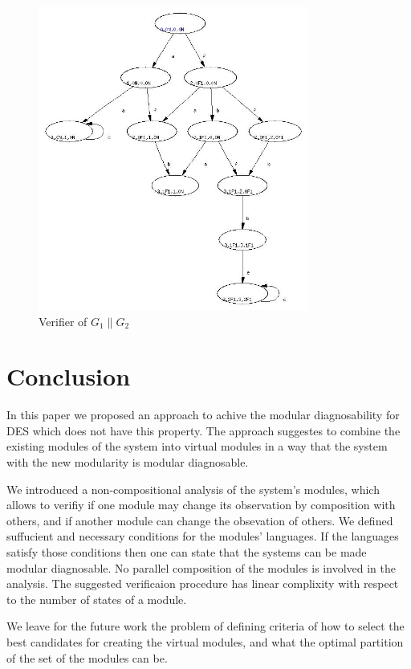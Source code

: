 \documentclass[a4paper, 10pt, conference]{ieeeconf}
\begin{document}
\begin{figure}[t]
\centering
\includegraphics[height=100mm]{verifier_G1G2.jpg}
\caption{Verifier of $G_1 \parallel G_2$}
\label{fig:verifier_G1G2}
\end{figure}


\section{Conclusion}
\label{sec:Conclusion}

In this paper we proposed an approach to achive the modular diagnosability
for DES which does not have this property. The approach suggestes to combine
the existing modules of the system into virtual modules in a way that the
system with the new modularity is modular diagnosable.

We introduced a non-compositional analysis of the system's modules, which
allows to verifiy if one module may change its observation by composition with
others, and if another module can change the obsevation of others. We defined
suffucient and necessary conditions for the modules' languages. If the languages
satisfy those conditions then one can state that the systems can be made modular
diagnosable. No parallel composition of the modules is involved in the analysis.
The suggested verificaion procedure has linear complixity with respect to
the number of states of a module.

We leave for the future work the problem of defining criteria of how to select
the best candidates for creating the virtual modules, and what the optimal
partition of the set of the modules can be.
\end{document}
